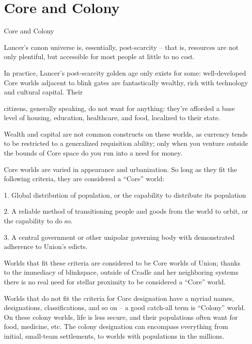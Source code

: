\chapter{Core and Colony}
Core and Colony  

Lancer’s canon universe is, essentially, post-scarcity -- that is, resources are not only plentiful,  
but accessible for most people at little to no cost. 
 

In practice, Lancer’s post-scarcity golden age only exists for some: well-developed Core worlds  
adjacent to blink gates are fantastically wealthy, rich with technology and cultural capital. Their  

                                                                                                           


citizens, generally speaking, do not want for anything: they’re afforded a base level of housing,  
education, healthcare, and food, localized to their state. 
 

Wealth and capital are not common constructs on these worlds, as currency tends to be  
restricted to a generalized requisition ability; only when you venture outside the bounds of Core  
space do you run into a need for money. 
 

Core worlds are varied in appearance and urbanization. So long as they fit the following criteria,  
they are considered a “Core” world: 
 

     1.  Global distribution of population, or the capability to distribute its population
 
    2.   A reliable method of transitioning people and goods from the world to orbit, or the  
         capability to do so. 
 
     3.  A central government or other unipolar governing body with demonstrated adherence to  
         Union’s edicts. 
 

Worlds that fit these criteria are considered to be Core worlds of Union; thanks to the immediacy  
of blinkspace, outside of Cradle and her neighboring systems there is no real need for stellar  
proximity to be considered a “Core” world. 
 

Worlds that do not fit the criteria for Core designation have a myriad names, designations,  
classifications, and so on -- a good catch-all term is “Colony” world. On these colony worlds, life  
is less secure, and their populations often want for food, medicine, etc. The colony designation  
can encompass everything from initial, small-team settlements, to worlds with populations in the  
millions.  
 


